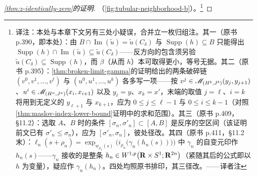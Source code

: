 \begin{proof}[\cref{thm:z-identically-zero}的证明]
（\cref{fig:tubular-neighborhood-b}）。\footnote{译注：本处与本章下文另有三处小疑误，合并立一枚归组注。其一（原书 p.390，即本处）：由 $B\cap\operatorname{Im}(\widetilde{u})=\widetilde{u}(C_{\delta})$ 与 $\operatorname{Supp}(h)\subseteq B$ 只能得出 $\operatorname{Supp}(h)\cap\operatorname{Im}(\widetilde{u})\subseteq\widetilde{u}(C_{\delta})$——反方向的包含须另验 $\widetilde{u}(C_{\delta})\subseteq\operatorname{Supp}(h)$，而 $\beta$（从而 $h$）本可取得更小，等号无据。其二（原书 p.395）：\cref{thm:broken-limit-gamma}的证明给出的两条破碎链 $(v^{0},v^{1},\dotsc,v^{\ell})$ 与 $(u^{0},u^{1},\dotsc,u^{k})$ 各多写一项——按 $v^{j}\in\mathscr{M}_{(H^{b},J^{b})}(y_{j},y_{j+1})$、$u^{i}\in\mathscr{M}_{(H^{a},J^{a})}(x_{i},x_{i+1})$ 以及 $y_{\ell}=y$、$x_{k}=x'$，末端的取值 $j=\ell$、$i=k$ 将用到无定义的 $y_{\ell+1}$ 与 $x_{k+1}$，应为 $0\le j\le\ell-1$ 与 $0\le i\le k-1$（对照\cref{thm:maslov-index-lower-bound}证明中的求和范围）。其三（原书 p.409，§11.2）：选取 $A$、$B$ 时的条件 $[\sigma_{n},\sigma'_{n}]\subset[A,B]$ 是反序的空区间（该证明前文已有 $\sigma'_{n}\le\sigma_{n}$），应为 $[\sigma'_{n},\sigma_{n}]$，彼处径改。其四（原书 p.411，§11.2 末）：$\ell_{n}(s+\rho_{n})=\exp_{w_{\rho_{n}}(s)}\bigl(i_{\rho_{n}}\bigl(\gamma_{n}(h_{n}(s))\bigr)\bigr)$ 中 $\gamma_{n}$ 的自变元印作 $h_{n}(s)$——$\gamma_{n}$ 接收的是整条\trSection{} $h_{n}\in W^{1,p}\bigl(\mathbf{R}\times S^{1};\mathbf{R}^{2n}\bigr)$（紧随其后的公式即以 $h$ 为变量），疑应作 $\gamma_{n}(h_{n})$。四处均照原书排印，其三径改。——译者注}


\end{proof}
